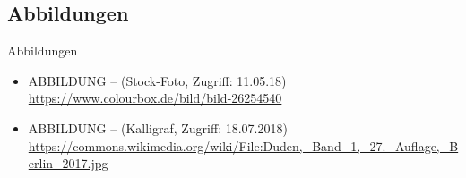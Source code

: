 
\subsection{Abbildungen}

\begin{frame}{Abbildungen}
\small

\begin{itemize}
	\item ABBILDUNG --  (Stock-Foto, Zugriff: 11.05.18)
	\url{https://www.colourbox.de/bild/bild-26254540}
	\item ABBILDUNG --  (Kalligraf, Zugriff: 18.07.2018) \url{https://commons.wikimedia.org/wiki/File:Duden,_Band_1,_27._Auflage,_Berlin_2017.jpg}
\end{itemize}	

\end{frame}

